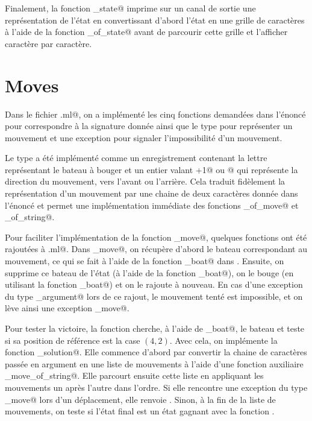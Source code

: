 \documentclass[a4paper,12pt]{article}
\begin{document}
Finalement, la fonction \verb@output_state@ imprime sur un canal de sortie une représentation de l'état en convertissant d'abord l'état en une grille de caractères à l'aide de la fonction \verb@grid_of_state@ avant de parcourir cette grille et l'afficher caractère par caractère.

\section{Moves}

Dans le fichier \verb@moves.ml@, on a implémenté les cinq fonctions demandées dans l'énoncé pour correspondre à la signature donnée ainsi que le type pour représenter un mouvement et une exception pour signaler l'impossibilité d'un mouvement.

Le type \verb@move@ a été implémenté comme un enregistrement contenant la lettre représentant le bateau à bouger et un entier valant \verb@+1@ ou @ qui représente la direction du mouvement, vers l'avant ou l'arrière. Cela traduit fidèlement la représentation d'un mouvement par une chaine de deux caractères donnée dans l'énoncé et permet une implémentation immédiate des fonctions \verb@string_of_move@ et \verb@move_of_string@.

Pour faciliter l'implémentation de la fonction \verb@apply_move@, quelques fonctions ont été rajoutées à \verb@port.ml@. Dans \verb@apply_move@, on récupère d'abord le bateau correspondant au mouvement, ce qui se fait à l'aide de la fonction \verb@get_boat@ dans \verb@Port@. Ensuite, on supprime ce bateau de l'état (à l'aide de la fonction \verb@remove_boat@), on le bouge (en utilisant la fonction \verb@move_boat@) et on le rajoute à nouveau. En cas d'une exception du type \verb@Invalid_argument@ lors de ce rajout, le mouvement tenté est impossible, et on lève ainsi une exception \verb@Cannot_move@.

Pour tester la victoire, la fonction \verb@win@ cherche, à l'aide de \verb@get_boat@, le bateau \verb@A@ et teste si sa position de référence est la case $(4, 2)$. Avec cela, on implémente la fonction \verb@check_solution@. Elle commence d'abord par convertir la chaine de caractères passée en argument en une liste de mouvements à l'aide d'une fonction auxiliaire \verb@list_move_of_string@. Elle parcourt ensuite cette liste en appliquant les mouvements un après l'autre dans l'ordre. Si elle rencontre une exception du type \verb@Cannot_move@ lors d'un déplacement, elle renvoie \verb@false@. Sinon, à la fin de la liste de mouvements, on teste si l'état final est un état gagnant avec la fonction \verb@win@.
\end{document}
